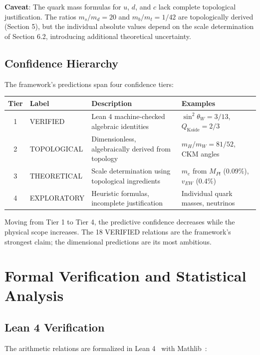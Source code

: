 \documentclass[11pt,a4paper]{article}
\newcommand{\EW}{\mathrm{EW}}
\newcommand{\Pl}{\mathrm{Pl}}
\def\EW{EW}%
\def\Pl{Pl}%
\begin{document}
\textbf{Caveat}: The quark mass formulas for $u$, $d$, and $c$ lack complete topological justification. The ratios $m_s/m_d = 20$ and $m_b/m_t = 1/42$ are topologically derived (Section 5), but the individual absolute values depend on the scale determination of Section 6.2, introducing additional theoretical uncertainty.

\subsection{Confidence Hierarchy}

The framework's predictions span four confidence tiers:

\begin{table}[H]
\centering
\small
\begin{tabular}{cllp{5cm}}
\toprule
Tier & Label & Description & Examples \\
\midrule
1 & VERIFIED & Lean 4 machine-checked algebraic identities & $\sin^2\theta_W = 3/13$, $Q_{\mathrm{Koide}} = 2/3$ \\
2 & TOPOLOGICAL & Dimensionless, algebraically derived from topology & $m_H/m_W = 81/52$, CKM angles \\
3 & THEORETICAL & Scale determination using topological ingredients & $m_e$ from $M_{\Pl}$ (0.09\%), $v_{\EW}$ (0.4\%) \\
4 & EXPLORATORY & Heuristic formulas, incomplete justification & Individual quark masses, neutrinos \\
\bottomrule
\end{tabular}
\end{table}

Moving from Tier 1 to Tier 4, the predictive confidence decreases while the physical scope increases. The 18 VERIFIED relations are the framework's strongest claim; the dimensional predictions are its most ambitious.

\section{Formal Verification and Statistical Analysis}

\subsection{Lean 4 Verification}

The arithmetic relations are formalized in Lean 4~\cite{demoura2021} with Mathlib~\cite{mathlib}:
\end{document}
